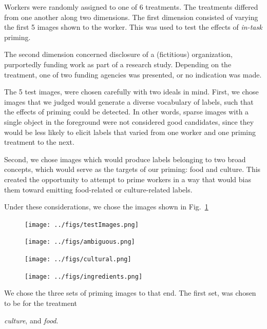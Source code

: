 \documentclass[letterpaper, 11pt, twocolumn]{article}
\begin{document}
Workers were randomly assigned to one of 6 treatments.  The treatments differed
from one another along two dimensions. The first dimension consisted of 
varying the first 5 images shown to the worker.  This was used to test the
effects of \textit{in-task} priming.

The second dimension concerned disclosure of a (fictitious) organization,
purportedly funding work as part of a research study.  Depending on the 
treatment, one of two funding agencies was presented, or no indication was 
made.

The 5 test images, were chosen carefully with two ideals in mind.  
First, we chose images that we judged would generate a diverse vocabulary of 
labels, such that the effects of priming could be detected.  In other words,
sparse images with a single object in the foreground were not considered good 
candidates, since they would be less likely to elicit labels that varied from 
one worker and one priming treatment to the next.

Second, we chose images which would produce labels belonging to two broad
concepts, which would serve as the targets of our priming: food and culture.  
This created the opportunity to attempt to prime workers in a way that would
bias them toward emitting food-related or culture-related labels.

Under these considerations, we chose the images shown in 
Fig.~\ref{fig:testImages}

\begin{figure}
	\texttt{[image: ../figs/testImages.png]}
	\label{fig:testImages}
\end{figure}

\begin{figure}
	\texttt{[image: ../figs/ambiguous.png]}
	\label{fig:ambiguous}
\end{figure}

\begin{figure}
	\texttt{[image: ../figs/cultural.png]}
	\label{fig:cultural}
\end{figure}

\begin{figure}
	\texttt{[image: ../figs/ingredients.png]}
	\label{fig:ingredients}
\end{figure}

We chose the three sets of priming images to that end.  The first set, was 
chosen to be 
for the treatment 

\textit{culture}, and \textit{food}.
\end{document}
